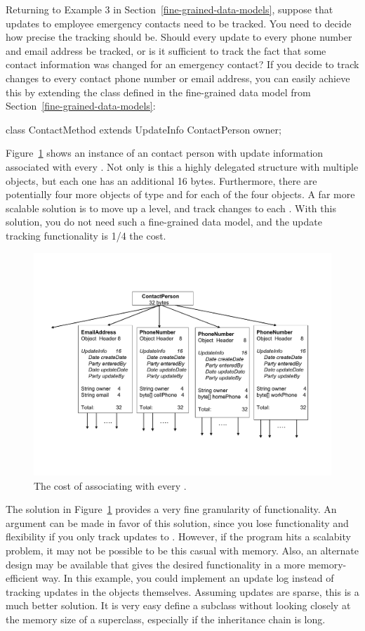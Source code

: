 Returning to Example 3 in Section~\ref{fine-grained-data-models}, suppose that
updates to employee emergency contacts need to be tracked. You need to decide
how precise the tracking should be. Should every update to every phone number
and email address be tracked, or is it sufficient to track the fact that some
contact information was changed for an emergency contact? If you decide to
track changes to every contact phone number or email address, you can easily achieve this by extending the  class defined in the fine-grained data model from Section~\ref{fine-grained-data-models}:
\begin{shortlisting}
class ContactMethod extends UpdateInfo {
     ContactPerson owner;
}
\end{shortlisting}
Figure~\ref{fig:big-base-class} shows an instance of an contact person with
update information associated with every . Not only is this
a highly delegated structure with multiple  objects, but
each one has an additional 16 bytes. Furthermore, there are potentially four
more objects of type  and  for each of the four
 objects. A far more scalable solution is to move up a
level, and track changes to each . With this solution, you
do not need such a fine-grained data model, and the update tracking functionality is 1/4 the cost.
\begin{figure}
  \centering
 \includegraphics[width=.70\textwidth]{Figures/chapter4/big-base-class.pdf}
  \caption{The cost of associating  with every
  .}
  \label{fig:big-base-class}
\end{figure}
 
The solution in Figure~\ref{fig:big-base-class} provides a very fine
granularity of functionality. An argument can be made in favor of this
solution, since you lose functionality and flexibility if you only track
updates to . However, if the program hits a scalabity
problem, it may not be possible to be this casual with memory. Also, an alternate design may be available that gives the desired functionality in a more memory-efficient way. In this example, you could implement an update log instead of tracking updates in the objects themselves. Assuming updates are sparse, this is a much better solution. It is very easy define a subclass without looking closely at the memory size of a superclass, especially if the inheritance chain is long.

